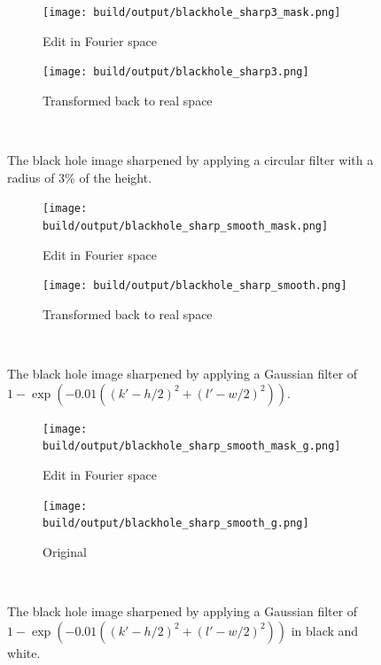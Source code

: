 \begin{figure}[htbp]
    \centering
    \begin{subfigure}[h]{.49\linewidth}
        \centering
        \texttt{[image: build/output/blackhole\_sharp3\_mask.png]}
        \caption{Edit in Fourier space}
    \end{subfigure}
    \begin{subfigure}[h]{.49\linewidth}
        \centering
        \texttt{[image: build/output/blackhole\_sharp3.png]}
        \caption{Transformed back to real space}
    \end{subfigure}\
    \caption{The black hole image sharpened by applying a circular filter with a radius of 3\% of the height.}
    \label{fig:blackhole_sharp3}
\end{figure}
\begin{figure}[htbp]
    \centering
    \begin{subfigure}[h]{.49\linewidth}
        \centering
        \texttt{[image: build/output/blackhole\_sharp\_smooth\_mask.png]}
        \caption{Edit in Fourier space}
    \end{subfigure}
    \begin{subfigure}[h]{.49\linewidth}
        \centering
        \texttt{[image: build/output/blackhole\_sharp\_smooth.png]}
        \caption{Transformed back to real space}
    \end{subfigure}\
    \caption{The black hole image sharpened by applying a Gaussian filter of $1-\exp(-0.01 ((k'-h/2)^2+(l'-w/2)^2))$.}
    \label{fig:blackhole_sharp_g}
\end{figure}
\begin{figure}[htbp]
    \centering
    \begin{subfigure}[h]{.49\linewidth}
        \centering
        \texttt{[image: build/output/blackhole\_sharp\_smooth\_mask\_g.png]}
        \caption{Edit in Fourier space}
    \end{subfigure}
    \begin{subfigure}[h]{.49\linewidth}
        \centering
        \texttt{[image: build/output/blackhole\_sharp\_smooth\_g.png]}
        \caption{Original}
    \end{subfigure}\
    \caption{The black hole image sharpened by applying a Gaussian filter of $1-\exp(-0.01 ((k'-h/2)^2+(l'-w/2)^2))$ in black and white.}
    \label{fig:blackhole_sharp_g_g}
\end{figure}

